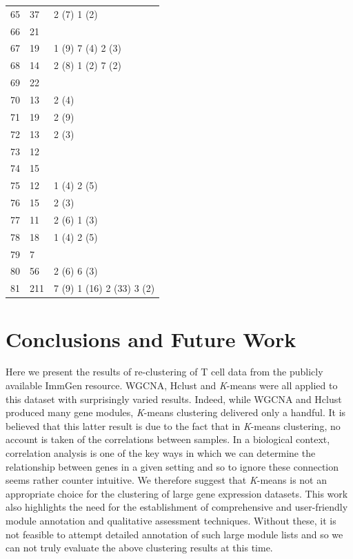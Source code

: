 \begin{landscape}
\begin{longtable}{|p{1.5cm}|p{1.25cm}|p{21cm}|}
65 & 37 & 2 (7) 1 (2) \\
66 & 21 & \\
67 & 19 & 1 (9) 7 (4) 2 (3) \\
68 & 14 & 2 (8) 1 (2) 7 (2) \\
69 & 22 & \\
70 & 13 & 2 (4) \\
71 & 19 & 2 (9) \\
72 & 13 & 2 (3) \\
73 & 12 & \\
74 & 15 & \\
75 & 12 & 1 (4) 2 (5) \\
76 & 15 & 2 (3) \\
77 & 11 & 2 (6) 1 (3) \\
78 & 18 & 1 (4) 2 (5) \\
79 & 7 & \\
80 & 56 & 2 (6) 6 (3) \\
81 & 211 & 7 (9) 1 (16) 2 (33) 3 (2) \\


\hline
\end{longtable}
\end{landscape}

\section{Conclusions and Future Work}

Here we present the results of re-clustering of T cell data from the publicly available ImmGen resource. WGCNA, Hclust and \textit{K}-means were all applied to this dataset with surprisingly varied results. Indeed, while WGCNA and Hclust produced many gene modules, \textit{K}-means clustering delivered only a handful. It is believed that this latter result is due to the fact that in \textit{K}-means clustering, no account is taken of the correlations between samples. In a biological context, correlation analysis is one of the key ways in which we can determine the relationship between genes in a given setting and so to ignore these connection seems rather counter intuitive. We therefore suggest that \textit{K}-means is not an appropriate choice for the clustering of large gene expression datasets. This work also highlights the need for the establishment of comprehensive and user-friendly module annotation and qualitative assessment techniques. Without these, it is not feasible to attempt detailed annotation of such large module lists and so we can not truly evaluate the above clustering results at this time.




